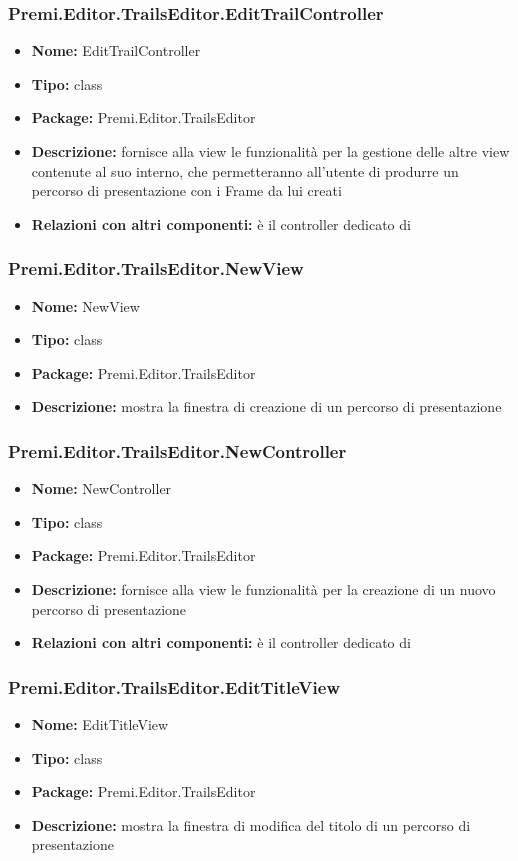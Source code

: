 \subsubsection{Premi.Editor.TrailsEditor.EditTrailController}
\begin{itemize}
  \item \textbf{Nome:} EditTrailController
  \item \textbf{Tipo:} class
  \item \textbf{Package:} Premi.Editor.TrailsEditor
  \item \textbf{Descrizione:} fornisce alla view le funzionalità per la gestione delle altre view contenute al suo interno, che permetteranno all'utente di produrre un percorso di presentazione con i Frame da lui creati
  \item \textbf{Relazioni con altri componenti:} è il controller dedicato di   
\end{itemize}
\subsubsection{Premi.Editor.TrailsEditor.NewView}
\begin{itemize}
  \item \textbf{Nome:} NewView
  \item \textbf{Tipo:} class
  \item \textbf{Package:} Premi.Editor.TrailsEditor
  \item \textbf{Descrizione:} mostra la finestra di creazione di un percorso di presentazione
\end{itemize}
\subsubsection{Premi.Editor.TrailsEditor.NewController}
\begin{itemize}
  \item \textbf{Nome:} NewController
  \item \textbf{Tipo:} class
  \item \textbf{Package:} Premi.Editor.TrailsEditor
  \item \textbf{Descrizione:} fornisce alla view le funzionalità per la creazione di un nuovo percorso di presentazione
  \item \textbf{Relazioni con altri componenti:} è il controller dedicato di   
\end{itemize}
\subsubsection{Premi.Editor.TrailsEditor.EditTitleView}
\begin{itemize}
  \item \textbf{Nome:} EditTitleView
  \item \textbf{Tipo:} class
  \item \textbf{Package:} Premi.Editor.TrailsEditor
  \item \textbf{Descrizione:} mostra la finestra di modifica del titolo di un percorso di presentazione
\end{itemize}
